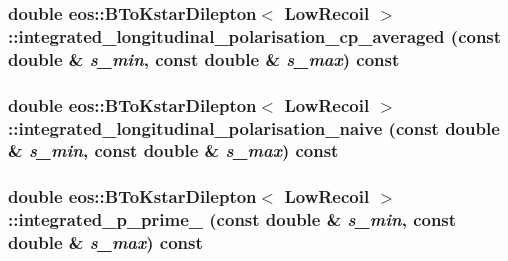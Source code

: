 \label{classeos_1_1BToKstarDilepton_3_01LowRecoil_01_4_a209fd5571fe2d963a7fcdffb50402253}
\hypertarget{classeos_1_1BToKstarDilepton_3_01LowRecoil_01_4_a5a45dcc1284d1372f652af3a9ad1e168}{
\subsubsection[{integrated\_\-longitudinal\_\-polarisation\_\-cp\_\-averaged}]{\setlength{\rightskip}{0pt plus 5cm}double eos::BToKstarDilepton$<$ {\bf LowRecoil} $>$::integrated\_\-longitudinal\_\-polarisation\_\-cp\_\-averaged (const double \& {\em s\_\-min}, \/  const double \& {\em s\_\-max}) const}}
\label{classeos_1_1BToKstarDilepton_3_01LowRecoil_01_4_a5a45dcc1284d1372f652af3a9ad1e168}
\hypertarget{classeos_1_1BToKstarDilepton_3_01LowRecoil_01_4_acafbe819d47149274cc6337044c50c29}{
\subsubsection[{integrated\_\-longitudinal\_\-polarisation\_\-naive}]{\setlength{\rightskip}{0pt plus 5cm}double eos::BToKstarDilepton$<$ {\bf LowRecoil} $>$::integrated\_\-longitudinal\_\-polarisation\_\-naive (const double \& {\em s\_\-min}, \/  const double \& {\em s\_\-max}) const}}
\label{classeos_1_1BToKstarDilepton_3_01LowRecoil_01_4_acafbe819d47149274cc6337044c50c29}
\hypertarget{classeos_1_1BToKstarDilepton_3_01LowRecoil_01_4_a968b483ff53e3a67d8b0887d8f894467}{
\subsubsection[{integrated\_\-p\_\-prime\_\-4}]{\setlength{\rightskip}{0pt plus 5cm}double eos::BToKstarDilepton$<$ {\bf LowRecoil} $>$::integrated\_\-p\_\-prime\_ (const double \& {\em s\_\-min}, \/  const double \& {\em s\_\-max}) const}}
